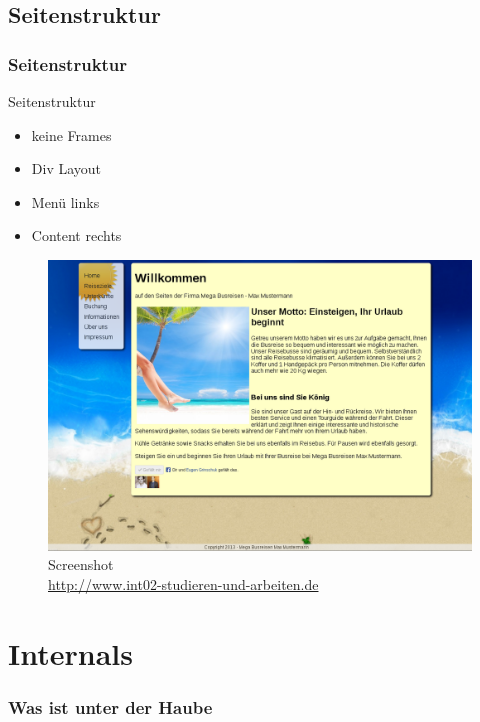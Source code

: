 \documentclass[xcolor=dvipsnames]{beamer}
\begin{document}
\subsection{Seitenstruktur}
\begin{frame} %
  \frametitle{Seitenstruktur} %
  \begin{block}{Seitenstruktur}
	\begin{itemize}
		\item keine Frames
		\item Div Layout
		\item Menü links
		\item Content rechts
	\end{itemize}
  \end{block}
\end{frame}


\begin{frame}
	\begin{figure}
	\includegraphics[scale=0.4]{screenshot_website.png}
	\caption{Screenshot \\ \tiny{\textcolor{gray}				{\url{http://www.int02-studieren-und-arbeiten.de}}}}
	\end{figure}
\end{frame}

\section{Internals}
\begin{frame}[shrink] %
  \frametitle{Was ist unter der Haube} %
\end{frame}
\end{document}

